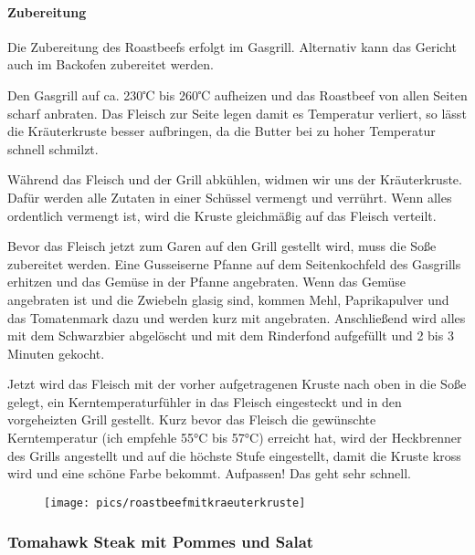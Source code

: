\paragraph{Zubereitung}

Die Zubereitung des Roastbeefs erfolgt im Gasgrill. Alternativ kann das
Gericht auch im Backofen zubereitet werden. 

Den Gasgrill auf ca. 230℃ 
bis 260℃ aufheizen und das Roastbeef von allen Seiten scharf anbraten. Das 
Fleisch zur Seite legen damit es Temperatur verliert, so lässt die Kräuterkruste 
besser aufbringen, da die Butter bei zu hoher Temperatur schnell schmilzt.

Während das Fleisch und der Grill abkühlen, widmen wir uns der Kräuterkruste. 
Dafür werden alle Zutaten in einer Schüssel vermengt und 
verrührt.
Wenn alles ordentlich vermengt ist, wird die Kruste gleichmäßig auf das
Fleisch verteilt.

Bevor das Fleisch jetzt zum Garen auf den Grill gestellt wird, muss
die Soße zubereitet werden. Eine Gusseiserne Pfanne auf dem 
Seitenkochfeld
des Gasgrills erhitzen und das Gemüse in der Pfanne angebraten. Wenn 
das
Gemüse angebraten ist und die Zwiebeln glasig sind, kommen Mehl,
Paprikapulver und das Tomatenmark dazu und werden kurz mit 
angebraten.
Anschließend wird alles mit dem Schwarzbier abgelöscht und mit dem
Rinderfond aufgefüllt und 2 bis 3 Minuten gekocht.

Jetzt wird das Fleisch mit der vorher aufgetragenen Kruste nach oben in
die Soße gelegt, ein Kerntemperaturfühler in das Fleisch eingesteckt und in den 
vorgeheizten Grill gestellt.
Kurz bevor das Fleisch die gewünschte Kerntemperatur (ich empfehle 55°C bis 
57°C) erreicht hat, wird
der Heckbrenner des Grills angestellt und auf die höchste Stufe 
eingestellt, damit die Kruste kross wird und eine schöne Farbe bekommt. 
Aufpassen!
Das geht sehr schnell.
\newpage

\begin{figure}[htbp]
	\centering
	\begin{minipage}{1\textwidth}
		\centering
		\texttt{[image: pics/roastbeefmitkraeuterkruste]}
		\label{fig:Roastbeef}
	\end{minipage}
\end{figure}
\newpage
\subsubsection{Tomahawk Steak mit Pommes und Salat}

